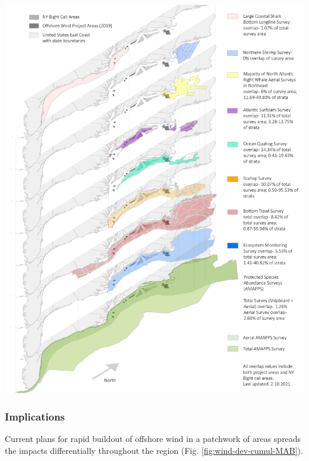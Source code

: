 \documentclass[
  10pt,
]{article}
\let\origfigure\figure
\let\endorigfigure\endfigure
\renewenvironment{figure}[1][2] {
    \expandafter\origfigure\expandafter[H]
} {
    \endorigfigure
}
\begin{document}
\begin{figure}

{\centering \includegraphics[width=0.8\linewidth]{images/SurveyMap2021210_renamed} 

}

\caption{Interaction of Greater Atlantic Fisheries Scientific Surveys and Offshore Wind Development}\label{fig:wind-dev-survey}
\end{figure}

\hypertarget{implications-7}{%
\subsubsection{Implications}\label{implications-7}}

Current plans for rapid buildout of offshore wind in a patchwork of
areas spreads the impacts differentially throughout the region (Fig.
\ref{fig:wind-dev-cumul-MAB}).\\
\end{document}
